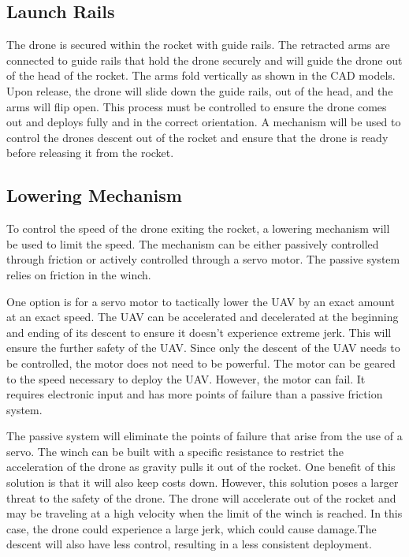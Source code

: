 	\subsection{Launch Rails}
		The drone is secured within the rocket with guide rails. The retracted arms are connected to guide rails that hold the drone securely and will guide the drone out of the head of the rocket. The arms fold vertically as shown in the CAD models. Upon release, the drone will slide down the guide rails, out of the head, and the arms will flip open. This process must be controlled to ensure the drone comes out and deploys fully and in the correct orientation. A mechanism will be used to control the drones descent out of the rocket and ensure that the drone is ready before releasing it from the rocket.

	\subsection{Lowering Mechanism}
		To control the speed of the drone exiting the rocket, a lowering mechanism will be used to limit the speed. The mechanism can be either passively controlled through friction or actively controlled through a servo motor. The passive system relies on friction in the winch. 

		One option is for a servo motor to tactically lower the UAV by an exact amount at an exact speed. The UAV can be accelerated and decelerated at the beginning and ending of its descent to ensure it doesn't experience extreme jerk. This will ensure the further safety of the UAV. Since only the descent of the UAV needs to be controlled, the motor does not need to be powerful. The motor can be geared to the speed necessary to deploy the UAV. However, the motor can fail. It requires electronic input and has more points of failure than a passive friction system.
	
		The passive system will eliminate the points of failure that arise from the use of a servo. The winch can be built with a specific resistance to restrict the acceleration of the drone as gravity pulls it out of the rocket. One benefit of this solution is that it will also keep costs down. However, this solution poses a larger threat to the safety of the drone. The drone will accelerate out of the rocket and may be traveling at a high velocity when the limit of the winch is reached. In this case, the drone could experience a large jerk, which could cause damage.The descent will also have less control, resulting in a less consistent deployment.
	
